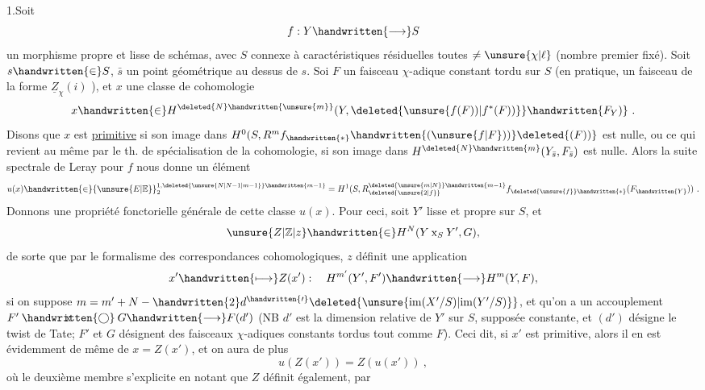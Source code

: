 
1.\quad Soit
\[
f:Y\handwritten{\longrightarrow}S
\]
un morphisme propre et lisse de schémas, avec $S$  connexe à caractéristiques résiduelles toutes $\ne\unsure{\chi|\ell}$ (nombre premier fixé). Soit $s\handwritten{\in}S$, $\bar s$ un point géométrique au dessus de $s$. Soi $F$ un faisceau $\chi$-adique constant tordu sur $S$ (en pratique, un faisceau de la forme $\underline{Z}_{\chi}(i)$ ), et $x$ une classe de cohomologie
\[
x\handwritten{\in}H^{\deleted{N}\handwritten{\unsure{m}}}(Y,\deleted{\unsure{f(F))|f^*(F))}}\handwritten{F_Y)}\ .
\]
Disons que $x$ est \uline{primitive} si son image dans $H^0(S,R^m f_{\handwritten{*}}\handwritten{(\unsure{f|F}))}\deleted{(F))}$ est nulle, ou ce qui revient au même par le th. de spécialisation de la cohomologie, si son image dans $H^{\deleted{N}\handwritten{m}}(Y_{\bar s},F_{\bar s})$ est nulle. Alors la suite spectrale de Leray pour $f$ nous donne un élément
\[
u(x)\handwritten{\in}{\unsure{E|\mathbb{E}}}_2^{1,\deleted{\unsure{N|N-1|m-1}}\handwritten{m-1}}=H^1(S,R^{\deleted{\unsure{m|N}}\handwritten{m-1}}_{\deleted{\unsure{2|f}}}f_{\deleted{\unsure{f}}\handwritten{*}}(F_{\handwritten{Y}}))\ .
\]
Donnons une propriété fonctorielle générale de cette classe $u(x)$. Pour ceci, soit $Y'$ lisse et propre sur $S$, et
\[
\unsure{Z|\mathbb{Z}|z}\handwritten{\in}H^N(Y\mathbin{\mathrm{x}}_S Y',G),
\]
de sorte que par le formalisme des correspondances cohomologiques, $z$ définit une application
\[
x'\handwritten{\longmapsto}Z(x'): \quad H^{m'}(Y',F')\handwritten{\longrightarrow}H^m(Y,F),
\]
si on suppose $m=m'+N-\handwritten{2}d^{\handwritten{\prime}}\deleted{\unsure{\mathrm{im}(X'/S)|\mathrm{im}(Y'/S)}}$, et qu'on a un accouplement $F'\mathbin{\ooalign{\hfil$\mathrm{x}$\hfil\cr\hfil$\handwritten{\bigcirc}$\hfil\cr}}G\handwritten{\longrightarrow}F(d')$ (NB $d'$ est la dimension relative de $Y'$ sur $S$, supposée constante, et $(d')$ désigne le twist de Tate; $F'$ et $G$ désignent des faisceaux $\chi$-adiques constants tordus  tout comme $F$). Ceci dit, si $x'$ est primitive, alors il en est évidemment de même de $x=Z(x')$, et on aura de plus
\[
u(Z(x'))=Z(u(x'))\ ,
\]
où le deuxième membre s'explicite en notant que $Z$ définit également, par
